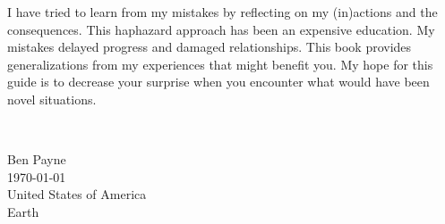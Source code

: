 





I have tried to learn from my mistakes by reflecting on my (in)actions and the consequences. This haphazard approach has been an expensive education. My mistakes delayed progress and damaged relationships. This book provides generalizations from my experiences that might benefit you. My hope for this guide is to decrease your surprise when you encounter what would have been novel situations.



\ \\

\begin{flushright}
Ben Payne\\
\today\\
United States of America\\
Earth
\end{flushright}


